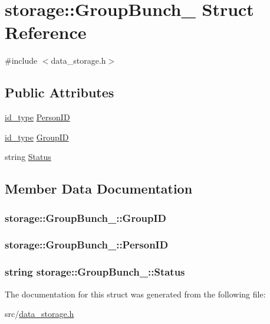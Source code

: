 \hypertarget{structstorage_1_1GroupBunch__}{
\section{storage::GroupBunch\_\- Struct Reference}
\label{d3/db8/structstorage_1_1GroupBunch__}
}


{\ttfamily \#include $<$data\_\-storage.h$>$}

\subsection*{Public Attributes}
\begin{DoxyCompactItemize}
\item 
\hyperlink{types_8h_a0b60c08a3ab1435cccc5643d32d8ccee}{id\_\-type} \hyperlink{structstorage_1_1GroupBunch___ab7c018c8d79c50d64f28ffcd279b21a4}{PersonID}
\item 
\hyperlink{types_8h_a0b60c08a3ab1435cccc5643d32d8ccee}{id\_\-type} \hyperlink{structstorage_1_1GroupBunch___a761c0b9cdc83ee74754a43f13953933d}{GroupID}
\item 
string \hyperlink{structstorage_1_1GroupBunch___a6a28ad5ef8fe8361e56530026675e2bf}{Status}
\end{DoxyCompactItemize}


\subsection{Member Data Documentation}
\hypertarget{structstorage_1_1GroupBunch___a761c0b9cdc83ee74754a43f13953933d}{
\subsubsection[{GroupID}]{ {\bf storage::GroupBunch\_\-::GroupID}}}
\label{d3/db8/structstorage_1_1GroupBunch___a761c0b9cdc83ee74754a43f13953933d}
\hypertarget{structstorage_1_1GroupBunch___ab7c018c8d79c50d64f28ffcd279b21a4}{
\subsubsection[{PersonID}]{ {\bf storage::GroupBunch\_\-::PersonID}}}
\label{d3/db8/structstorage_1_1GroupBunch___ab7c018c8d79c50d64f28ffcd279b21a4}
\hypertarget{structstorage_1_1GroupBunch___a6a28ad5ef8fe8361e56530026675e2bf}{
\subsubsection[{Status}]{\setlength{\rightskip}{0pt plus 5cm}string {\bf storage::GroupBunch\_\-::Status}}}
\label{d3/db8/structstorage_1_1GroupBunch___a6a28ad5ef8fe8361e56530026675e2bf}


The documentation for this struct was generated from the following file:\begin{DoxyCompactItemize}
\item 
src/\hyperlink{data__storage_8h}{data\_\-storage.h}\end{DoxyCompactItemize}
